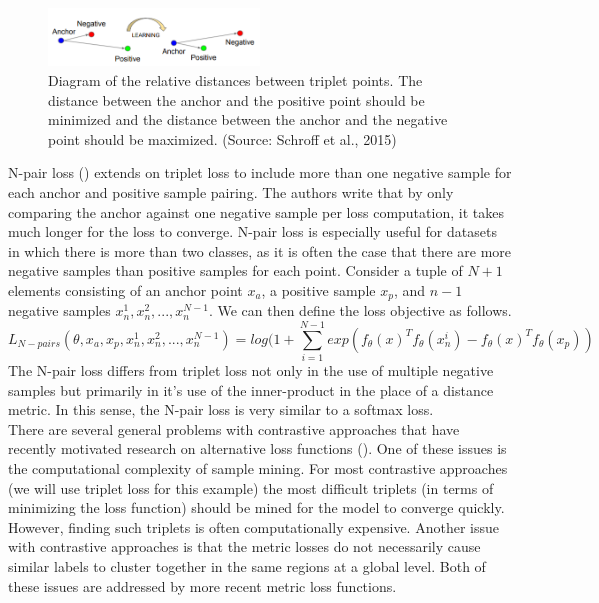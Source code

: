 \documentclass[./dissertation.tex]{subfiles}
\begin{document}
    \begin{figure}[h]
        \centering\includegraphics[width=0.5\textwidth]{figures/triplet_loss_figure}
        \caption{Diagram of the relative distances between triplet points. The distance between the anchor and the positive point should be minimized and the distance between the anchor and the negative point should be maximized. (Source: Schroff et al., 2015)}
        \label{Triplet Loss Diagram}
    \end{figure}
    
    N-pair loss (\cite{sohn2016improved}) extends on triplet loss to include more than one negative sample for each anchor and positive sample pairing. The authors write that by only comparing the anchor against one negative sample per loss computation, it takes much longer for the loss to converge. N-pair loss is especially useful for datasets in which there is more than two classes, as it is often the case that there are more negative samples than positive samples for each point. Consider a tuple of $N + 1$ elements consisting of an anchor point $x_{a}$, a positive sample $x_{p}$, and $n - 1$ negative samples $x_{n}^{1}, x_{n}^{2}, ..., x_{n}^{N - 1}$. We can then define the loss objective as follows.
    \begin{equation*}
    L_{N-pairs}(\theta, x_{a}, x_{p}, x_{n}^{1}, x_{n}^{2}, ..., x_{n}^{N - 1}) = log(1 + \sum_{i=1}^{N-1} 
    exp(f_{\theta}(x)^{T} f_{\theta}(x_{n}^{i}) 
    - f_{\theta}(x)^{T} f_{\theta}(x_{p})
    )
    \end{equation*} 
    The N-pair loss differs from triplet loss not only in the use of multiple negative samples but primarily in it's use of the inner-product in the place of a distance metric. In this sense, the N-pair loss is very similar to a softmax loss. \\
    
    There are several general problems with contrastive approaches that have recently motivated research on alternative loss functions (\cite{hav4ik2021deepmetriclearning}). One of these issues is the computational complexity of sample mining. For most contrastive approaches (we will use triplet loss for this example) the most difficult triplets (in terms of minimizing the loss function) should be mined for the model to converge quickly. However, finding such triplets is often computationally expensive. Another issue with contrastive approaches is that the metric losses do not necessarily cause similar labels to cluster together in the same regions at a global level. Both of these issues are addressed by more recent metric loss functions.
    
\end{document}
